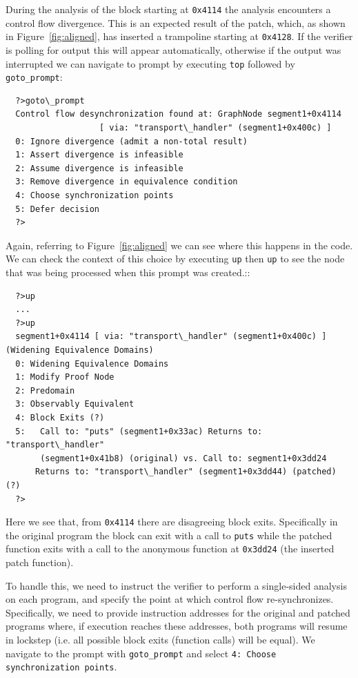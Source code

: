 During the analysis of the block starting at \texttt{0x4114} the analysis encounters a control flow divergence.
This is an expected result of the patch, which, as shown in Figure~\ref{fig:aligned}, has inserted a trampoline starting at \texttt{0x4128}.
If the verifier is polling for output this will appear automatically, otherwise if the output was interrupted we can navigate to prompt by executing \texttt{top} followed by \texttt{goto\_prompt}:
\begin{verbatim}
  ?>goto\_prompt
  Control flow desynchronization found at: GraphNode segment1+0x4114
                   [ via: "transport\_handler" (segment1+0x400c) ]
  0: Ignore divergence (admit a non-total result)
  1: Assert divergence is infeasible
  2: Assume divergence is infeasible
  3: Remove divergence in equivalence condition
  4: Choose synchronization points
  5: Defer decision
  ?>
\end{verbatim}
Again, referring to Figure~\ref{fig:aligned} we can see where this happens in the code.
We can check the context of this choice by executing \texttt{up} then \texttt{up} to see the node that was being processed when this prompt was created.::
\begin{verbatim}
  ?>up
  ...
  ?>up
  segment1+0x4114 [ via: "transport\_handler" (segment1+0x400c) ] (Widening Equivalence Domains)
  0: Widening Equivalence Domains
  1: Modify Proof Node
  2: Predomain
  3: Observably Equivalent
  4: Block Exits (?)
  5:   Call to: "puts" (segment1+0x33ac) Returns to: "transport\_handler"
       (segment1+0x41b8) (original) vs. Call to: segment1+0x3dd24
      Returns to: "transport\_handler" (segment1+0x3dd44) (patched) (?)
  ?>
\end{verbatim}

Here we see that, from \texttt{0x4114} there are disagreeing block exits.
Specifically in the original program the block can exit with a call to \texttt{puts} while the patched function exits with a call to the anonymous function at \texttt{0x3dd24} (the inserted patch function).

To handle this, we need to instruct the verifier to perform a single-sided analysis on each program, and specify the point at which control flow re-synchronizes.
Specifically, we need to provide instruction addresses for the original and patched programs where, if execution reaches these addresses, both programs will resume in lockstep (i.e. all possible block exits (function calls) will be equal).
We navigate to the prompt with \texttt{goto\_prompt} and select \texttt{4: Choose synchronization points}.

